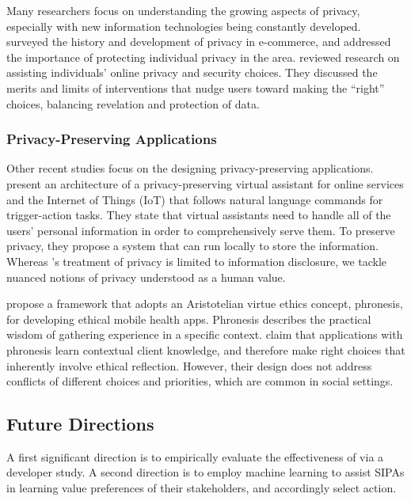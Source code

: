 Many researchers focus on understanding the growing aspects of privacy, especially with new information technologies being constantly developed. 
% 
\citet{smith2007privacy} surveyed the history and development of privacy in e-commerce, and addressed the importance of protecting individual privacy in the area. \citet{Acquisti-2017-Nudges+Privacy+Security} reviewed research on assisting individuals' online privacy and security choices. They discussed the merits and limits of interventions that nudge users toward making the ``right'' choices, balancing revelation and protection of data. 

\subsubsection{Privacy-Preserving Applications}

Other recent studies focus on the designing privacy-preserving applications.
% 
\citet{Campagna-WWW2017-Almond} present an architecture of a privacy-preserving virtual assistant for online services and the Internet of Things (IoT) that follows natural language commands for trigger-action tasks. They state that virtual assistants need to handle all of the users' personal information in order to comprehensively serve them. To preserve privacy, they propose a system that can run locally to store the information. 
Whereas \citet{Campagna-WWW2017-Almond}'s treatment of privacy is limited to information disclosure, we tackle nuanced notions of privacy understood as a human value.

\citet{Barry-CHI2017-EthicalDesign} propose a framework that adopts an Aristotelian virtue ethics concept, phronesis, for developing ethical mobile health apps. Phronesis describes the practical wisdom of gathering experience in a specific context. \citet{Barry-CHI2017-EthicalDesign} claim that applications with phronesis learn contextual client knowledge, and therefore make right choices that inherently involve ethical reflection. However, their design does not address conflicts of different choices and priorities, which are common in social settings. 

\subsection{Future Directions}
A first significant direction is to empirically evaluate the effectiveness of
\frameworkAinur via a developer study. 
A second direction is to employ machine learning to assist
SIPAs in learning value preferences of their stakeholders, 
and accordingly select action.

